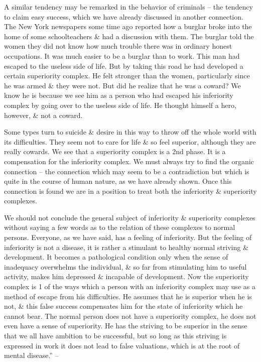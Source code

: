 \documentclass{article}
\numberwithin{equation}{section}
\begin{document}
A similar tendency may be remarked in the behavior of criminals -- the tendency to claim easy success, which we have already discussed in another connection. The New York newspapers some time ago reported how a burglar broke into the home of some schoolteachers \& had a discussion with them. The burglar told the women they did not know how much trouble there was in ordinary honest occupations. It was much easier to be a burglar than to work. This man had escaped to the useless side of life. But by taking this road he had developed a certain superiority complex. He felt stronger than the women, particularly since he was armed \& they were not. But did he realize that he was a coward? We know he is because we see him as a person who had escaped his inferiority complex by going over to the useless side of life. He thought himself a hero, however, \& not a coward.

Some types turn to suicide \& desire in this way to throw off the whole world with its difficulties. They seem not to care for life \& so feel superior, although they are really cowards. We see that a superiority complex is a 2nd phase. It is a compensation for the inferiority complex. We must always try to find the organic connection -- the connection which may seem to be a contradiction but which is quite in the course of human nature, as we have already shown. Once this connection is found we are in a position to treat both the inferiority \& superiority complexes.

We should not conclude the general subject of inferiority \& superiority complexes without saying a few words as to the relation of these complexes to normal persons. Everyone, as we have said, has a feeling of inferiority. But the feeling of inferiority is not a disease, it is rather a stimulant to healthy normal striving \& development. It becomes a pathological condition only when the sense of inadequacy overwhelms the individual, \& so far from stimulating him to useful activity, makes him depressed \& incapable of development. Now the superiority complex is 1 of the ways which a person with an inferiority complex may use as a method of escape from his difficulties. He assumes that he is superior when he is not, \& this false success compensates him for the state of inferiority which he cannot bear. The normal person does not have a superiority complex, he does not even have a sense of superiority. He has the striving to be superior in the sense that we all have ambition to be successful, but so long as this striving is expressed in work it does not lead to false valuations, which is at the root of mental disease.'' -- \cite[pp. 78--97]{Adler2013}
\end{document}
